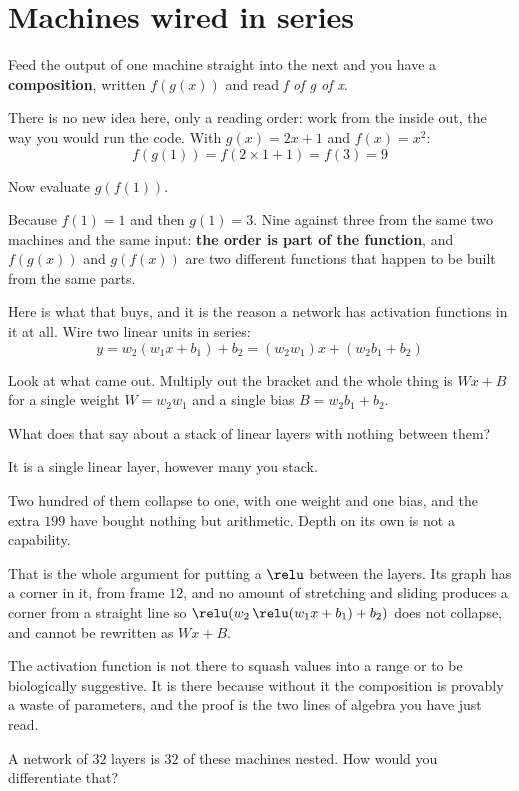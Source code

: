 \section{Machines wired in series}
\label{sec:F05-composition}

\begin{fr}
Feed the output of one machine straight into the next and you have a
\textbf{composition}, written $f(g(x))$ and read \emph{f of g of x}.

There is no new idea here, only a reading order: work from the inside out, the
way you would run the code. With $g(x) = 2x + 1$ and $f(x) = x^{2}$:
\[ f(g(1)) = f(2 \times 1 + 1) = f(3) = 9 \]

Now evaluate $g(f(1))$.
\nextframe
\end{fr}

\begin{fr}
Because $f(1) = 1$ and then $g(1) = 3$. Nine against three from the same two
machines and the same input: \textbf{the order is part of the function}, and
$f(g(x))$ and $g(f(x))$ are two different functions that happen to be built
from the same parts.

Here is what that buys, and it is the reason a network has activation functions
in it at all. Wire two linear units in series:
\[ y = w_2(w_1 x + b_1) + b_2 = (w_2 w_1)x + (w_2 b_1 + b_2) \]

Look at what came out. Multiply out the bracket and the whole thing is
$Wx + B$ for a single weight $W = w_2 w_1$ and a single bias
$B = w_2 b_1 + b_2$.

What does that say about a stack of linear layers with nothing between them?
\nextframe
\end{fr}

\begin{fr}
\begin{ansblock}
It is a single linear layer, however many you stack.
\end{ansblock}

Two hundred of them collapse to one, with one weight and one bias, and the
extra $199$ have bought nothing but arithmetic. Depth on its own is not a
capability.

\begin{aibox}
That is the whole argument for putting a $\relu$ between the layers. Its graph
has a corner in it, from frame $12$, and no amount of stretching and sliding
produces a corner from a straight line \dash{} so
$\relu(w_2\,\relu(w_1 x + b_1) + b_2)$ does not collapse, and cannot be
rewritten as $Wx + B$.

The activation function is not there to squash values into a range or to be
biologically suggestive. It is there because without it the composition is
provably a waste of parameters, and the proof is the two lines of algebra you
have just read.
\end{aibox}

A network of $32$ layers is $32$ of these machines nested. How would you
differentiate that?
\nextframe
\end{fr}

